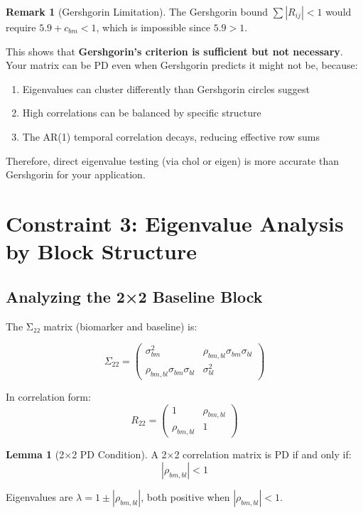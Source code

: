 \documentclass[12pt,a4paper]{article}
\theoremstyle{definition}
\newtheorem{lemma}{Lemma}
\newtheorem{remark}{Remark}
\begin{document}
\begin{remark}[Gershgorin Limitation]
The Gershgorin bound $\sum |R_{ij}| < 1$ would require $5.9 + c_{bm} < 1$, which is impossible since $5.9 > 1$.

This shows that \textbf{Gershgorin's criterion is sufficient but not necessary}. Your matrix can be PD even when Gershgorin predicts it might not be, because:
\begin{enumerate}
  \item Eigenvalues can cluster differently than Gershgorin circles suggest
  \item High correlations can be balanced by specific structure
  \item The AR(1) temporal correlation decays, reducing effective row sums
\end{enumerate}

Therefore, direct eigenvalue testing (via chol or eigen) is more accurate than Gershgorin for your application.
\end{remark}

\section{Constraint 3: Eigenvalue Analysis by Block Structure}

\subsection{Analyzing the 2×2 Baseline Block}

The Σ₂₂ matrix (biomarker and baseline) is:

\[
  \Sigma_{22} = \begin{pmatrix}
    \sigma_{bm}^2 & \rho_{bm,bl} \sigma_{bm} \sigma_{bl} \\
    \rho_{bm,bl} \sigma_{bm} \sigma_{bl} & \sigma_{bl}^2
  \end{pmatrix}
\]

In correlation form:
\[
  R_{22} = \begin{pmatrix}
    1 & \rho_{bm,bl} \\
    \rho_{bm,bl} & 1
  \end{pmatrix}
\]

\begin{lemma}[2×2 PD Condition]
A 2×2 correlation matrix is PD if and only if:
\[
  |\rho_{bm,bl}| < 1
\]

Eigenvalues are $\lambda = 1 \pm |\rho_{bm,bl}|$, both positive when $|\rho_{bm,bl}| < 1$.
\end{lemma}
\end{document}
